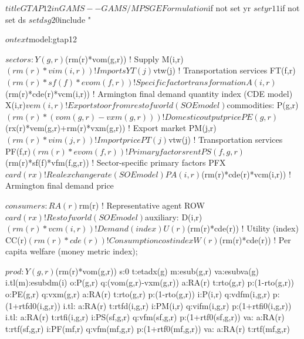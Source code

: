 \begin{GAMSCode*}
$title   GTAP12inGAMS -- GAMS/MPSGE Formulation

$if not set yr $set yr 11
$if not set ds $set ds g20
$include "%

$ontext
$model:gtap12

$sectors:
        Y(g,r)$(rm(r)*vom(g,r))         ! Supply
        M(i,r)$(rm(r)*vim(i,r))         ! Imports
        YT(j)$vtw(j)                    ! Transportation services
        FT(f,r)$(rm(r)*sf(f)*evom(f,r)) ! Specific factor transformation
        A(i,r)$(rm(r)*cde(r)*vcm(i,r))  ! Armington final demand quantity index (CDE model)
        X(i,r)$vem(i,r)                 ! Exports to or from rest of world (SOE model)

$commodities:
        P(g,r)$(rm(r)*(vom(g,r)-vxm(g,r)))              ! Domestic output price
        PE(g,r)$(rx(r)*vem(g,r)+rm(r)*vxm(g,r))         ! Export market
        PM(j,r)$(rm(r)*vim(j,r))                        ! Import price
        PT(j)$vtw(j)                                    ! Transportation services
        PF(f,r)$(rm(r)*evom(f,r))                       ! Primary factors rent
        PS(f,g,r)$(rm(r)*sf(f)*vfm(f,g,r))              ! Sector-specific primary factors
        PFX$card(rx)                                    ! Real exchange rate (SOE model)
        PA(i,r)$(rm(r)*cde(r)*vcm(i,r))                 ! Armington final demand price

$consumers:
        RA(r)$rm(r)             ! Representative agent
        ROW$card(rx)            ! Rest of world (SOE model)

$auxiliary:
        D(i,r)$(rm(r)*vcm(i,r)) ! Demand (index)
        U(r)$(rm(r)*cde(r))     ! Utility (index)
        CC(r)$(rm(r)*cde(r))    ! Consumption cost index
        W(r)$(rm(r)*cde(r))     ! Per capita welfare (money metric index);

$prod:Y(g,r)$(rm(r)*vom(g,r)) s:0 t:etadx(g) m:esub(g,r) va:esubva(g) i.tl(m):esubdm(i)
        o:P(g,r)        q:(vom(g,r)-vxm(g,r))   a:RA(r)  t:rto(g,r)     p:(1-rto(g,r))
        o:PE(g,r)       q:vxm(g,r)              a:RA(r)  t:rto(g,r)     p:(1-rto(g,r))
        i:P(i,r)        q:vdfm(i,g,r)   p:(1+rtfd0(i,g,r)) i.tl:  a:RA(r) t:rtfd(i,g,r)
        i:PM(i,r)       q:vifm(i,g,r)   p:(1+rtfi0(i,g,r)) i.tl:  a:RA(r) t:rtfi(i,g,r)
        i:PS(sf,g,r)    q:vfm(sf,g,r)   p:(1+rtf0(sf,g,r))  va:   a:RA(r) t:rtf(sf,g,r)
        i:PF(mf,r)      q:vfm(mf,g,r)   p:(1+rtf0(mf,g,r))  va:   a:RA(r) t:rtf(mf,g,r)


\end{GAMSCode*}

